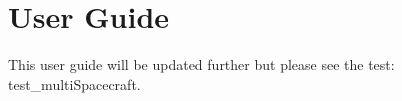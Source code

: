 
\section{User Guide}

This user guide will be updated further but please see the test: test\_multiSpacecraft.

